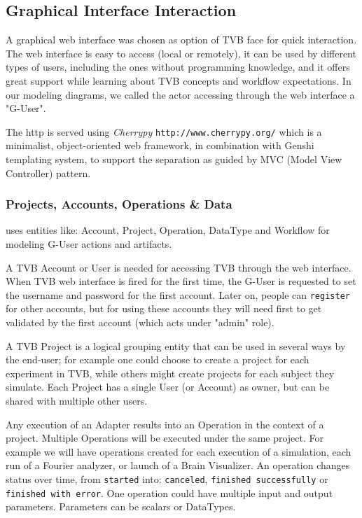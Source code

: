 
\subsection{Graphical Interface Interaction}

A graphical web interface was chosen as option of TVB face for quick interaction. The web interface is easy to access (local or remotely),
it can be used by different types of users, including the ones without programming knowledge, and it offers great 
support while learning about TVB concepts and workflow expectations. 
In our modeling diagrams, we called the actor accessing \TVB through the web interface a "G-User".

The http is served using \emph{Cherrypy} \texttt{http://www.cherrypy.org/} which is a minimalist, object-oriented web framework, 
in combination with Genshi templating system, to support the separation as guided by MVC (Model View Controller) pattern.

	\subsubsection{Projects, Accounts, Operations \& Data}
	
\TVB uses entities like: Account, Project, Operation, DataType and Workflow for modeling G-User actions and artifacts. 

 A TVB Account or User is needed for accessing TVB through the web interface. 
 When TVB web interface is fired for the first time, the G-User is requested to set the username and password for the first account.
Later on, people can \texttt{register} for other accounts, but for using these accounts they will need first to get validated by the 
first account (which acts under "admin" role).

A TVB Project is a logical grouping entity that  can be used in several ways by the end-user; 
for example one could choose to create a project for each experiment in TVB, while others might create projects for each subject they simulate.
Each Project has a single User (or Account) as owner, but can be shared with multiple other users.

Any execution of an Adapter results into an Operation in the context of a project. Multiple Operations will be executed under the same project.
For example we will have operations created for each execution of a simulation, each run of a Fourier analyzer, or launch of a Brain Visualizer.
An operation changes status over time, from \texttt{started} into: \texttt{canceled}, \texttt{finished successfully} or \texttt{finished with error}.
One operation could have multiple input and output parameters. Parameters can be scalars or DataTypes.

